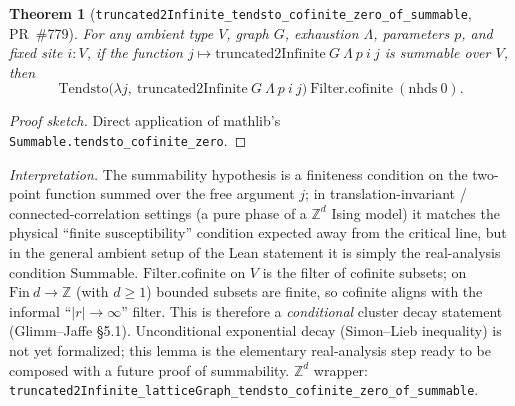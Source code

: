 \documentclass[a4paper,11pt]{article}
\newtheorem{theorem}{Theorem}
\begin{document}
\begin{theorem}[\texttt{truncated2Infinite\_tendsto\_cofinite\_zero\_of\_summable},
PR~\#779]
For any ambient type $V$, graph $G$, exhaustion $\Lambda$, parameters
$p$, and fixed site $i : V$, if the function
$j \mapsto \mathrm{truncated2Infinite}\ G\ \Lambda\ p\ i\ j$ is summable
over $V$, then
\[
  \mathrm{Tendsto}\bigl(\lambda j,\ \mathrm{truncated2Infinite}\ G\ \Lambda\ p\ i\ j\bigr)
    \ \mathrm{Filter.cofinite}\ (\mathrm{nhds}\ 0).
\]
\end{theorem}
\begin{proof}[Proof sketch]
Direct application of mathlib's \texttt{Summable.tendsto\_cofinite\_zero}.
\end{proof}
\noindent
\emph{Interpretation.} The summability hypothesis is a finiteness
condition on the two-point function summed over the free argument $j$;
in translation-invariant / connected-correlation settings (a pure phase
of a $\mathbb Z^d$ Ising model) it matches the physical ``finite
susceptibility'' condition expected away from the critical line, but in
the general ambient setup of the Lean statement it is simply the
real-analysis condition $\mathrm{Summable}$. $\mathrm{Filter.cofinite}$
on $V$ is the filter of cofinite subsets; on $\mathrm{Fin}\ d \to
\mathbb Z$ (with $d \ge 1$) bounded subsets are finite, so cofinite
aligns with the informal ``$|r| \to \infty$'' filter. This is therefore
a \emph{conditional} cluster decay statement (Glimm--Jaffe \S5.1).
Unconditional exponential decay (Simon--Lieb inequality) is not yet
formalized; this lemma is the elementary real-analysis step ready to be
composed with a future proof of summability. $\mathbb Z^d$ wrapper:
\texttt{truncated2Infinite\_latticeGraph\_tendsto\_cofinite\_zero\_of\_summable}.
\end{document}
